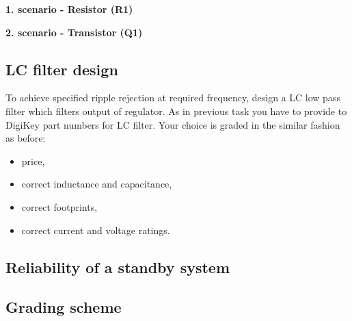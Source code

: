 \documentclass[a4paper]{article}
\begin{document}
\textbf{1. scenario - Resistor (R1)}

\textbf{2. scenario - Transistor (Q1)}

\subsection{LC filter design}

To achieve specified ripple rejection at required frequency, design a LC low 
pass filter which filters output of regulator. As in previous task you have 
to provide to DigiKey part numbers for LC filter. Your choice is graded in 
the similar fashion as before:
\begin{itemize}
\item price,
\item correct inductance and capacitance,
\item correct footprints, 
\item correct current and voltage ratings.
\end{itemize}

\subsection{Reliability of a standby system}


\subsection{Grading scheme}
 
\end{document}
